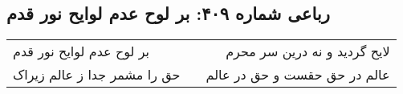 \begin{center}
\section*{رباعی شماره ۴۰۹: بر لوح عدم لوایح نور قدم}
\label{sec:sh409}
\begin{longtable}{l p{0.5cm} r}
بر لوح عدم لوایح نور قدم
&&
لایح گردید و نه درین سر محرم
\\
حق را مشمر جدا ز عالم زیراک
&&
عالم در حق حقست و حق در عالم
\\
\end{longtable}
\end{center}
